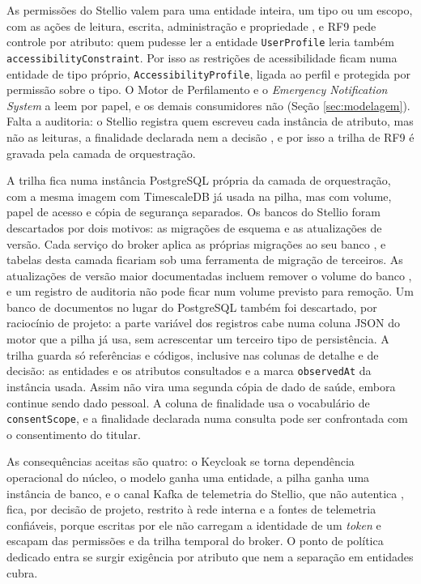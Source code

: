 As permissões do Stellio valem para uma entidade inteira, um tipo ou um escopo, com as ações de leitura, escrita, administração e propriedade \cite{stellio2025docs}, e RF9 pede controle por atributo: quem pudesse ler a entidade \texttt{UserProfile} leria também \texttt{accessibilityConstraint}. Por isso as restrições de acessibilidade ficam numa entidade de tipo próprio, \texttt{AccessibilityProfile}, ligada ao perfil e protegida por permissão sobre o tipo. O Motor de Perfilamento e o \textit{Emergency Notification System} a leem por papel, e os demais consumidores não (Seção \ref{sec:modelagem}). Falta a auditoria: o Stellio registra quem escreveu cada instância de atributo, mas não as leituras, a finalidade declarada nem a decisão \cite{stellio2025docs}, e por isso a trilha de RF9 é gravada pela camada de orquestração.

A trilha fica numa instância PostgreSQL própria da camada de orquestração, com a mesma imagem com TimescaleDB já usada na pilha, mas com volume, papel de acesso e cópia de segurança separados. Os bancos do Stellio foram descartados por dois motivos: as migrações de esquema e as atualizações de versão. Cada serviço do broker aplica as próprias migrações ao seu banco \cite{stellio2026repo}, e tabelas desta camada ficariam sob uma ferramenta de migração de terceiros. As atualizações de versão maior documentadas incluem remover o volume do banco \cite{stellio2025docs}, e um registro de auditoria não pode ficar num volume previsto para remoção. Um banco de documentos no lugar do PostgreSQL também foi descartado, por raciocínio de projeto: a parte variável dos registros cabe numa coluna JSON do motor que a pilha já usa, sem acrescentar um terceiro tipo de persistência. A trilha guarda só referências e códigos, inclusive nas colunas de detalhe e de decisão: as entidades e os atributos consultados e a marca \texttt{observedAt} da instância usada. Assim não vira uma segunda cópia de dado de saúde, embora continue sendo dado pessoal. A coluna de finalidade usa o vocabulário de \texttt{consentScope}, e a finalidade declarada numa consulta pode ser confrontada com o consentimento do titular.

As consequências aceitas são quatro: o Keycloak se torna dependência operacional do núcleo, o modelo ganha uma entidade, a pilha ganha uma instância de banco, e o canal Kafka de telemetria do Stellio, que não autentica \cite{stellio2025docs}, fica, por decisão de projeto, restrito à rede interna e a fontes de telemetria confiáveis, porque escritas por ele não carregam a identidade de um \textit{token} e escapam das permissões e da trilha temporal do broker. O ponto de política dedicado entra se surgir exigência por atributo que nem a separação em entidades cubra.

